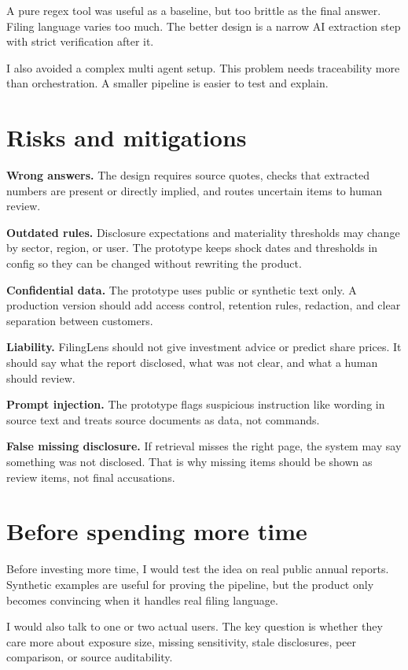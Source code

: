 \documentclass[10pt]{article}
\begin{document}
A pure regex tool was useful as a baseline, but too brittle as the final answer. Filing language varies too much. The better design is a narrow AI extraction step with strict verification after it.

I also avoided a complex multi agent setup. This problem needs traceability more than orchestration. A smaller pipeline is easier to test and explain.

\section{Risks and mitigations}

\textbf{Wrong answers.} The design requires source quotes, checks that extracted numbers are present or directly implied, and routes uncertain items to human review.

\textbf{Outdated rules.} Disclosure expectations and materiality thresholds may change by sector, region, or user. The prototype keeps shock dates and thresholds in config so they can be changed without rewriting the product.

\textbf{Confidential data.} The prototype uses public or synthetic text only. A production version should add access control, retention rules, redaction, and clear separation between customers.

\textbf{Liability.} FilingLens should not give investment advice or predict share prices. It should say what the report disclosed, what was not clear, and what a human should review.

\textbf{Prompt injection.} The prototype flags suspicious instruction like wording in source text and treats source documents as data, not commands.

\textbf{False missing disclosure.} If retrieval misses the right page, the system may say something was not disclosed. That is why missing items should be shown as review items, not final accusations.

\section{Before spending more time}

Before investing more time, I would test the idea on real public annual reports. Synthetic examples are useful for proving the pipeline, but the product only becomes convincing when it handles real filing language.

I would also talk to one or two actual users. The key question is whether they care more about exposure size, missing sensitivity, stale disclosures, peer comparison, or source auditability.
\end{document}
